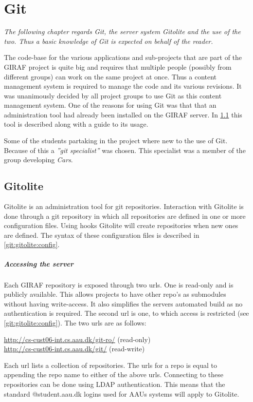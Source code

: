\chapter{Git}\label{collaboration:git}
\newcommand{\git}{Git}\newcommand{\Git}{Git}
\newcommand{\gitolite}{Gitolite}\newcommand{\Gitolite}{Gitolite}
\begin{center}
\textit{The following chapter regards \git{}, the server system \gitolite{} and the use of the two.
Thus a basic knowledge of \git{} is expected on behalf of the reader.}
\end{center}
The code-base for the various applications and sub-projects that are part of the GIRAF project is quite big and requires that multiple people (possibly from different groups) can work on the same project at once.
Thus a content management system is required to manage the code and its various revisions. 
It was unanimously decided by all project groups to use \git{} as this content management system.
One of the reasons for using \git{} was that that an administration tool had already been installed on the GIRAF server.
In \cref{git:gitolite} this tool is described along with a guide to its usage.

Some of the students partaking in the project where new to the use of \git{}.
Because of this a \textit{''git specialist''} was chosen.
This specialist was a member of the group developing \textit{Cars}.

\section{\Gitolite{}}\label{git:gitolite}
\Gitolite{} is an administration tool for git repositories.
Interaction with \gitolite{} is done through a git repository in which all repositories are defined in one or more configuration files.
Using hooks \gitolite{} will create repositories when new ones are defined.
The syntax of these configuration files is described in \cref{git:gitolite:config}.

\paragraph{Accessing the server}
Each GIRAF repository is exposed through two urls.
One is read-only and is publicly available.
This allows projects to have other repo's as submodules without having write-access.
It also simplifies the servers automated build as no authentication is required.
The second url is one, to which access is restricted (see \cref{git:gitolite:config}).
The two urls are as follows:
\begin{center}
\url{http://cs-cust06-int.cs.aau.dk/git-ro/} (read-only)\\
\url{http://cs-cust06-int.cs.aau.dk/git/} (read-write)
\end{center}
Each url lists a collection of repositories.
The urls for a repo is equal to appending the repo name to either of the above urls.
Connecting to these repositories can be done using LDAP authentication.
This means that the standard @student.aau.dk logins used for AAUs systems will apply to \gitolite{}.

